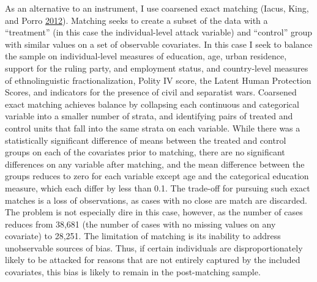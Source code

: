 \documentclass[12pt,]{book}
\theoremstyle{definition}
\theoremstyle{definition}
\theoremstyle{definition}
\theoremstyle{remark}
\begin{document}
As an alternative to an instrument, I use coarsened exact matching
(Iacus, King, and Porro \protect\hyperlink{ref-Iacus2012}{2012}).
Matching seeks to create a subset of the data with a ``treatment'' (in
this case the individual-level attack variable) and ``control'' group
with similar values on a set of observable covariates. In this case I
seek to balance the sample on individual-level measures of education,
age, urban residence, support for the ruling party, and employment
status, and country-level measures of ethnolinguistic fractionalization,
Polity IV score, the Latent Human Protection Scores, and indicators for
the presence of civil and separatist wars. Coarsened exact matching
achieves balance by collapsing each continuous and categorical variable
into a smaller number of strata, and identifying pairs of treated and
control units that fall into the same strata on each variable. While
there was a statistically significant difference of means between the
treated and control groups on each of the covariates prior to matching,
there are no significant differences on any variable after matching, and
the mean difference between the groups reduces to zero for each variable
except age and the categorical education measure, which each differ by
less than 0.1. The trade-off for pursuing such exact matches is a loss
of observations, as cases with no close are match are discarded. The
problem is not especially dire in this case, however, as the number of
cases reduces from 38,681 (the number of cases with no missing values on
any covariate) to 28,251. The limitation of matching is its inability to
address unobservable sources of bias. Thus, if certain individuals are
disproportionately likely to be attacked for reasons that are not
entirely captured by the included covariates, this bias is likely to
remain in the post-matching sample.
\end{document}
